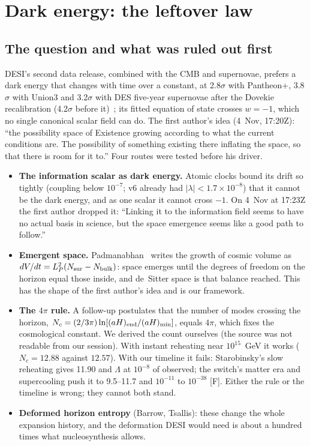 \documentclass[11pt,a4paper]{article}
\newcommand{\chk}[1]{\textsf{[#1]}}
\begin{document}
\section{Dark energy: the leftover law}\label{sec:de}

\subsection{The question and what was ruled out first}
DESI's second data release, combined with the CMB and supernovae, prefers a dark energy that changes with time over a constant, at
2.8$\sigma$ with Pantheon+, 3.8$\sigma$ with Union3 and 3.2$\sigma$ with DES five-year supernovae after the Dovekie recalibration
(4.2$\sigma$ before it)~\cite{desi,popovic}; its fitted equation of state crosses $w=-1$, which no single canonical
scalar field can do. The first author's idea (4~Nov, 17:20Z): ``the possibility space of Existence growing according to what the current
conditions are. The possibility of something existing there inflating the space, so that there is room for it to.'' Four routes were tested
before his driver.

\begin{itemize}[leftmargin=*,itemsep=2pt]
\item \textbf{The information scalar as dark energy.} Atomic clocks bound its drift so tightly (coupling below $10^{-7}$; v6 already had
$|\lambda|<1.7\times10^{-8}$) that it cannot be the dark energy, and as one scalar it cannot cross $-1$. On 4~Nov at 17:23Z the first author
dropped it: ``Linking it to the information field seems to have no actual basis in science, but the space emergence seems like a good path to
follow.''
\item \textbf{Emergent space.} Padmanabhan~\cite{padmanabhan} writes the growth of cosmic volume as $dV/dt=L_P^2(N_{\rm sur}-N_{\rm bulk})$:
space emerges until the degrees of freedom on the horizon equal those inside, and de~Sitter space is that balance reached. This has the shape
of the first author's idea and is our framework.
\item \textbf{The $4\pi$ rule.} A follow-up postulates that the number of modes crossing the horizon, $N_c=(2/3\pi)\ln[(aH)_{\rm end}/(aH)_{\rm min}]$,
equals $4\pi$, which fixes the cosmological constant. We derived the count ourselves (the source was not readable from our session). With
instant reheating near $10^{15}$~GeV it works ($N_c=12.88$ against $12.57$). With our timeline it fails: Starobinsky's slow reheating gives
11.90 and $\Lambda$ at $10^{-8}$ of observed; the switch's matter era and supercooling push it to 9.5--11.7 and $10^{-11}$ to $10^{-38}$
\chk{F}. Either the rule or the timeline is wrong; they cannot both stand.
\item \textbf{Deformed horizon entropy} (Barrow, Tsallis): these change the whole expansion history, and the deformation DESI would need
is about a hundred times what nucleosynthesis allows.
\end{itemize}
\end{document}
